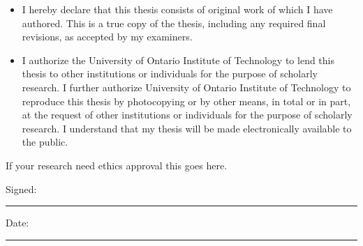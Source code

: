 \begin{abstract}
\addchaptertocentry{\abstractname} %
The Thesis Abstract is written here (and usually kept to just this page). The page is kept centered vertically!

The abstract occupies a single page and provides a summary of the thesis outlining the problem, methods of investigation, main results and general conclusions. The abstract must give enough information about the thesis to allow a potential reader to decide whether or not to consult the complete work. It should not include graphs, charts, illustrations, tables or references.

The abstract of a master’s thesis must not exceed 150 words, while the abstract of a doctoral thesis may be up to 350 words. These guidelines will be strictly enforced, or so they say over at SGPS...

At the end of the Abstract should appear a list of keywords. 
\\[0.5cm]
\textbf{Keywords:} \LaTeX, UOIT, Thesis
\end{abstract}

\begin{declaration}
\addchaptertocentry{\authorshipname} %

\begin{itemize} 
\item I hereby declare that this thesis consists of original work of which I have authored. This is a true copy of the thesis, including any required final revisions, as accepted by my examiners.
\item I authorize the University of Ontario Institute of Technology to lend this thesis to other institutions or individuals for the purpose of scholarly research. I further authorize University of Ontario Institute of Technology to reproduce this thesis by photocopying or by other means, in total or in part, at the request of other institutions or individuals for the purpose of scholarly research. I understand that my thesis will be made electronically available to the public.\\
\end{itemize}

If your research need ethics approval this goes here. 
 
\noindent Signed:\\
\rule[0.5em]{25em}{0.5pt} %
 
\noindent Date:\\
\rule[0.5em]{25em}{0.5pt} %
\end{declaration}




